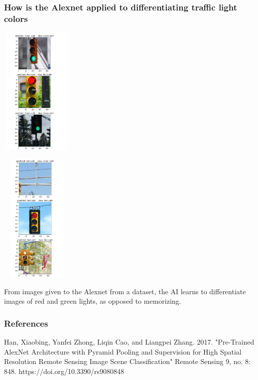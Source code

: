 \documentclass{beamer}
\begin{document}
\begin{frame}
\frametitle{How is the Alexnet applied to differentiating traffic light colors}
\begin{minipage}{0.3\textwidth}
\includegraphics[height =6.25cm,width=3.5cm]{pictures result1.PNG}

\end{minipage}
\begin{minipage}{0.3\textwidth}
\includegraphics[height =6.25cm,width=3.5cm]{pictures result2.PNG}

\end{minipage}
\begin{minipage}{0.2\textwidth}
From images given to the Alexnet from a dataset, the AI learns to differentiate images of red and green lights, as opposed to memorizing.
\end{minipage}



\newline








\end{frame}
\begin{frame}
\frametitle{References}
Han, Xiaobing, Yanfei Zhong, Liqin Cao, and Liangpei Zhang. 2017. "Pre-Trained AlexNet Architecture with Pyramid Pooling and Supervision for High Spatial Resolution Remote Sensing Image Scene Classification" Remote Sensing 9, no. 8: 848. https://doi.org/10.3390/rs9080848
\end{frame}
\end{document}
